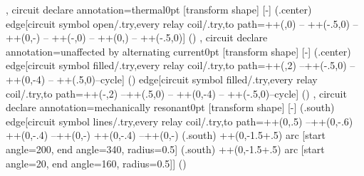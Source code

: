 {{  },
  circuit declare annotation={thermal}{0pt}
  {
    [transform shape]
    [-]
    (\tikzlastnode.center) edge[circuit symbol open/.try,every relay coil/.try,to path={++(\tikzcircuitssizeunit,0) -- ++(-.5\tikzcircuitssizeunit,0) -- ++(0,-\tikzcircuitssizeunit) -- ++(-\tikzcircuitssizeunit,0) -- ++(0,\tikzcircuitssizeunit) -- ++(-.5\tikzcircuitssizeunit,0)}] ()
  },
  circuit declare annotation={unaffected by alternating current}{0pt}
  {
    [transform shape]
    [-]
    (\tikzlastnode.center) edge[circuit symbol filled/.try,every relay coil/.try,to path={++(\tikzcircuitssizeunit,2\tikzcircuitssizeunit) --++(-.5\tikzcircuitssizeunit,0) -- ++(0,-4\tikzcircuitssizeunit) -- ++(.5\tikzcircuitssizeunit,0)--cycle}] () edge[circuit symbol filled/.try,every relay coil/.try,to path={++(-\tikzcircuitssizeunit,2\tikzcircuitssizeunit) --++(.5\tikzcircuitssizeunit,0) -- ++(0,-4\tikzcircuitssizeunit) -- ++(-.5\tikzcircuitssizeunit,0)--cycle}] ()
  },
  circuit declare annotation={mechanically resonant}{0pt}
  {
    [transform shape]
    [-]
    (\tikzlastnode.south) edge[circuit symbol lines/.try,every relay coil/.try,to path={++(0,.5\pgflinewidth) --++(0,-.6\tikzcircuitssizeunit) ++(0,-.4\tikzcircuitssizeunit) --++(0,-\tikzcircuitssizeunit) ++(0,-.4\tikzcircuitssizeunit)  --++(0,-\tikzcircuitssizeunit)
    (\tikzlastnode.south) ++(0,-1.5\tikzcircuitssizeunit+.5\pgflinewidth) arc [start angle=200, end angle=340, radius=0.5\tikzcircuitssizeunit]
    (\tikzlastnode.south) ++(0,-1.5\tikzcircuitssizeunit+.5\pgflinewidth) arc [start angle=20, end angle=160, radius=0.5\tikzcircuitssizeunit]}] ()
  }
}


